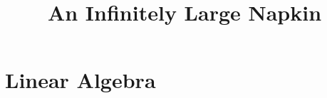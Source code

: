 \documentclass{book}
\newcommand{\parttoc}{}
\theoremstyle{definition}
\theoremstyle{definition}
\numberwithin{asy}{chapter}
\begin{document}
% 

\title{An Infinitely Large Napkin}


% 


% 
% 
% 

% 
% 
% 

% 
% 
% 

\part{Linear Algebra}
\label{part:linalg}
\parttoc

% 
% 
% 
% 
% 
% 
\end{document}

